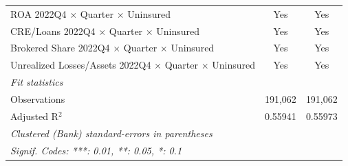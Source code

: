 \begin{tabular}{lcc}
   ROA 2022Q4 $\times$ Quarter $\times$ Uninsured               & Yes            & Yes\\
   CRE/Loans 2022Q4 $\times$ Quarter $\times$ Uninsured         & Yes            & Yes\\
   Brokered Share 2022Q4 $\times$ Quarter $\times$ Uninsured    & Yes            & Yes\\
   Unrealized Losses/Assets 2022Q4 $\times$ Quarter $\times$ Uninsured & Yes            & Yes\\
   \midrule
   \emph{Fit statistics}\\
   Observations                                                 & 191,062        & 191,062\\  
   Adjusted R$^2$                                               & 0.55941        & 0.55973\\  
   \midrule \midrule
   \multicolumn{3}{l}{\emph{Clustered (Bank) standard-errors in parentheses}}\\
   \multicolumn{3}{l}{\emph{Signif. Codes: ***: 0.01, **: 0.05, *: 0.1}}\\
\end{tabular}
\par\endgroup


